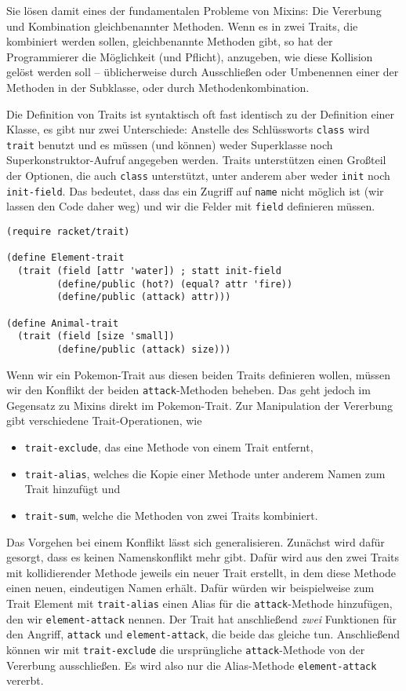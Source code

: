 Sie lösen damit eines der fundamentalen Probleme von Mixins: Die Vererbung und Kombination gleichbenannter Methoden. Wenn es in zwei Traits, die kombiniert werden sollen, gleichbenannte Methoden gibt, so hat der Programmierer die Möglichkeit (und Pflicht), anzugeben, wie diese Kollision gelöst werden soll -- üblicherweise durch Ausschließen oder Umbenennen einer der Methoden in der Subklasse, oder durch Methodenkombination.

Die Definition von Traits ist syntaktisch oft fast identisch zu der Definition einer Klasse, es gibt nur zwei Unterschiede: Anstelle des Schlüssworts \texttt{class} wird \texttt{trait} benutzt und es müssen (und können) weder Superklasse noch Superkonstruktor-Aufruf angegeben werden. Traits unterstützen einen Großteil der Optionen, die auch \texttt{class} unterstützt, unter anderem aber weder \texttt{init} noch \texttt{init-field}. Das bedeutet, dass das ein Zugriff auf \texttt{name} nicht möglich ist (wir lassen den Code daher weg) und wir die Felder mit \texttt{field} definieren müssen.

\begin{lstlisting}
(require racket/trait)

(define Element-trait
  (trait (field [attr 'water]) ; statt init-field
         (define/public (hot?) (equal? attr 'fire))
         (define/public (attack) attr)))

(define Animal-trait
  (trait (field [size 'small])
         (define/public (attack) size)))
\end{lstlisting}

Wenn wir ein Pokemon-Trait aus diesen beiden Traits definieren wollen, müssen wir den Konflikt der beiden \texttt{attack}-Methoden beheben. Das geht jedoch im Gegensatz zu Mixins direkt im Pokemon-Trait. Zur Manipulation der Vererbung gibt verschiedene Trait-Operationen, wie
\begin{itemize}
 \item \texttt{trait-exclude}, das eine Methode von einem Trait entfernt,
 \item \texttt{trait-alias}, welches die Kopie einer Methode unter anderem Namen zum Trait hinzufügt und
 \item \texttt{trait-sum}, welche die Methoden von zwei Traits kombiniert.
\end{itemize}

Das Vorgehen bei einem Konflikt lässt sich generalisieren. Zunächst wird dafür gesorgt, dass es keinen Namenskonflikt mehr gibt. Dafür wird aus den zwei Traits mit kollidierender Methode jeweils ein neuer Trait erstellt, in dem diese Methode einen neuen, eindeutigen Namen erhält. Dafür würden wir beispielweise zum Trait Element mit \texttt{trait-alias} einen Alias für die \texttt{attack}-Methode hinzufügen, den wir \texttt{element-attack} nennen. Der Trait hat anschließend \emph{zwei} Funktionen für den Angriff, \texttt{attack} und \texttt{element-attack}, die beide das gleiche tun. Anschließend können wir mit \texttt{trait-exclude} die ursprüngliche \texttt{attack}-Methode von der Vererbung ausschließen. Es wird also nur die Alias-Methode \texttt{element-attack} vererbt.

